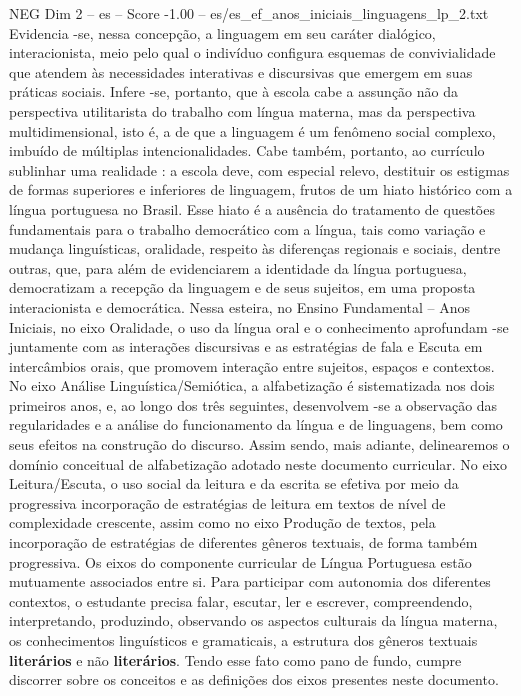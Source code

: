 \begin{textsample}{NEG Dim 2 – es – Score -1.00 – es/es\_ef\_anos\_iniciais\_linguagens\_lp\_2.txt}
Evidencia -se, nessa concepção, a linguagem em seu caráter dialógico, interacionista, meio pelo qual o indivíduo configura esquemas de convivialidade que atendem às necessidades interativas e discursivas que emergem em suas práticas sociais.
Infere -se, portanto, que à escola cabe a assunção não da perspectiva utilitarista do trabalho com língua materna, mas da perspectiva multidimensional, isto é, a de que a linguagem é um fenômeno social complexo, imbuído de múltiplas intencionalidades.
Cabe também, portanto, ao currículo sublinhar uma realidade : a escola deve, com especial relevo, destituir os estigmas de formas superiores e inferiores de linguagem, frutos de um hiato histórico com a língua portuguesa no Brasil.
Esse hiato é a ausência do tratamento de questões fundamentais para o trabalho democrático com a língua, tais como variação e mudança linguísticas, oralidade, respeito às diferenças regionais e sociais, dentre outras, que, para além de evidenciarem a identidade da língua portuguesa, democratizam a recepção da linguagem e de seus sujeitos, em uma proposta interacionista e democrática.
Nessa esteira, no Ensino Fundamental – Anos Iniciais, no eixo Oralidade, o uso da língua oral e o conhecimento aprofundam -se juntamente com as interações discursivas e as estratégias de fala e Escuta em intercâmbios orais, que promovem interação entre sujeitos, espaços e contextos.
No eixo Análise Linguística/Semiótica, a alfabetização é sistematizada nos dois primeiros anos, e, ao longo dos três seguintes, desenvolvem -se a observação das regularidades e a análise do funcionamento da língua e de linguagens, bem como seus efeitos na construção do discurso.
Assim sendo, mais adiante, delinearemos o domínio conceitual de alfabetização adotado neste documento curricular.
No eixo Leitura/Escuta, o uso social da leitura e da escrita se efetiva por meio da progressiva incorporação de estratégias de leitura em textos de nível de complexidade crescente, assim como no eixo Produção de textos, pela incorporação de estratégias de diferentes gêneros textuais, de forma também progressiva.
Os eixos do componente curricular de Língua Portuguesa estão mutuamente associados entre si.
Para participar com autonomia dos diferentes contextos, o estudante precisa falar, escutar, ler e escrever, compreendendo, interpretando, produzindo, observando os aspectos culturais da língua materna, os conhecimentos linguísticos e gramaticais, a estrutura dos gêneros textuais \textbf{literários} e não \textbf{literários}.
Tendo esse fato como pano de fundo, cumpre discorrer sobre os conceitos e as definições dos eixos presentes neste documento.

\end{textsample}
